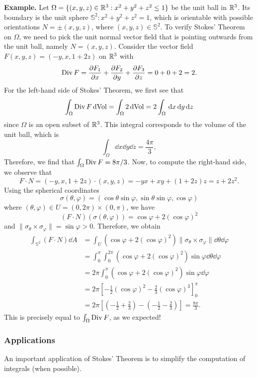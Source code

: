 {\bf Example.} Let $\Omega = \{(x, y, z) \in \mathbb{R}^3 : x^2 + y^2 + z^2 \leq 1\}$ be the 
unit ball in $\mathbb{R}^3$. Its boundary is the unit sphere $\mathbb S^2 : x^2 + y^2 + z^2 = 1$, 
which is orientable with possible orientations $N = \pm(x, y, z)$, where 
$(x, y, z) \in \mathbb S^2$. To verify Stokes' Theorem on $\Omega$, we need 
to pick the unit normal vector field that is pointing outwards from the 
unit ball, namely $N = (x, y, z)$. Consider the vector field 
$F(x, y, z) = (-y, x, 1 + 2z)$ on $\mathbb{R}^3$ with 
\[ \operatorname{Div} F = \frac{\partial F_1}{\partial x} + \frac{\partial F_2}{\partial y} 
+ \frac{\partial F_3}{\partial z} = 0 + 0 + 2 = 2. \] 
For the left-hand side of Stokes' Theorem, we first see that
\[ \int_\Omega \operatorname{Div} F \operatorname{dVol} = \int_\Omega 2\operatorname{dVol} = 2 \int_\Omega \,\mathrm{d} x \,\mathrm{d} y \,\mathrm{d} z \] 
since $\Omega$ is an open subset of $\mathbb{R}^3$. This integral corresponds to the volume of the unit ball, which is 
\[ \int_\Omega \dd x \dd y \dd z = \frac{4\pi}3, \] 
Therefore, we find that $\int_\Omega \operatorname{Div} F = 8\pi/3$. Now, 
to compute the right-hand side, we observe that 
\[ F \cdot N = (-y, x, 1+2z) \cdot (x, y, z) = -yx + xy + (1+2z)z = z + 2z^2. \] 
Using the spherical coordinates 
\[ \sigma(\theta, \varphi) = (\cos\theta\sin\varphi, \sin\theta\sin\varphi, \cos\varphi) \] 
where $(\theta, \varphi) \in U = (0, 2\pi) \times (0, \pi)$, we have 
\[ (F \cdot N)(\sigma(\theta, \varphi)) = \cos \varphi + 2(\cos \varphi)^2 \] 
and $\|\sigma_\theta \times \sigma_\varphi\| = \sin \varphi > 0$. 
Therefore, we obtain 
\begin{align*}
    \int_{\mathbb S^2} (F \cdot N)\dd A 
    &= \int_U (\cos\varphi + 2(\cos\varphi)^2)\|\sigma_\theta \times \sigma_\varphi\|\dd\theta\dd\varphi \\ 
    &= \int_0^\pi \int_0^{2\pi} (\cos\varphi + 2(\cos\varphi)^2) \sin\varphi \dd\theta \dd \varphi \\ 
    &= 2\pi \int_0^\pi (\cos\varphi + 2(\cos\varphi)^2) \sin\varphi\dd\varphi \\ 
    &= 2\pi \left[ -\frac12(\cos\varphi)^2 - \frac23(\cos\varphi)^3 \right]_0^\pi \\ 
    &= 2\pi \left[ \left( -\frac12 + \frac23 \right) - \left( -\frac12 - \frac23 \right) \right]  
    = \frac{8\pi}{3}.
\end{align*}
This is precisely equal to $\int_\Omega \operatorname{Div} F$, as we expected! 

\subsubsection{Applications} \label{subsubsec:4.3.1}
An important application of Stokes' Theorem is to simplify the computation 
of integrals (when possible). 

